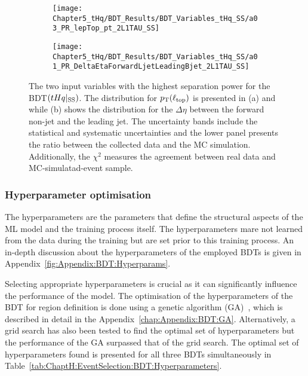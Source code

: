 \begin{figure}[h]
\centering
\begin{subfigure}{.475\textwidth}
  \centering
  \texttt{[image: Chapter5\_tHq/BDT\_Results/BDT\_Variables\_tHq\_SS/a03\_PR\_lepTop\_pt\_2L1TAU\_SS]}
  \caption{}%
  \label{fig:ChaptH:EventSelection:BDT:Top:tHqSS:ptTau}
\end{subfigure}%
\begin{subfigure}{.475\textwidth}
  \centering
  \texttt{[image: Chapter5\_tHq/BDT\_Results/BDT\_Variables\_tHq\_SS/a01\_PR\_DeltaEtaForwardLjetLeadingBjet\_2L1TAU\_SS]}
  \caption{}
  \label{fig:ChaptH:EventSelection:BDT:Top:tHqSS:deta}
\end{subfigure}
\caption{The two input variables with the highest separation power for the BDT$(tHq|_{\text{SS}})$.
The distribution for $p_{\text{T}}(\ell_{\text{top}})$ is presented in (a) and while (b) shows the distribution for the $\Delta \eta$ 
between the forward non-\btagged jet and the leading \btagged jet. The uncertainty bands include 
the statistical and systematic uncertainties and the lower panel presents the ratio between the collected data and the MC simulation.
Additionally, the $\chi^2$ measures the agreement between real data and MC-simulatad-event sample.}
\label{fig:ChaptH:EventSelection:BDT:Top:tHqSS}
\end{figure}





\FloatBarrier

\subsubsection{Hyperparameter optimisation}
\label{sec:ChaptH:EventSelection:BDT:Optimisation}
The hyperparameters are the parameters that define
the structural aspects of the ML model and the training process itself.
The hyperparameters mare not learned from the data during the
training but are set prior to this training process. 
An in-depth discussion about the hyperparameters of the employed
BDTs is given in  Appendix~\ref{fig:Appendix:BDT:Hyperparams}.

Selecting appropriate hyperparameters is crucial as it can significantly influence
the performance of the model. The optimisation of the hyperparameters of the BDT
for region definition is done using a genetic algorithm (GA)~\cite{MitchellGA}, 
which is described in detail in the Appendix~\ref{chap:Appendix:BDT:GA}.
Alternatively, a grid search has also been tested to find the optimal set
of hyperparameters but the performance of the GA surpassed that
of the grid search. %
The optimal set of hyperparameters found is presented for all three BDTs simultaneously 
in Table~\ref{tab:ChaptH:EventSelection:BDT:Hyperparameters}.


